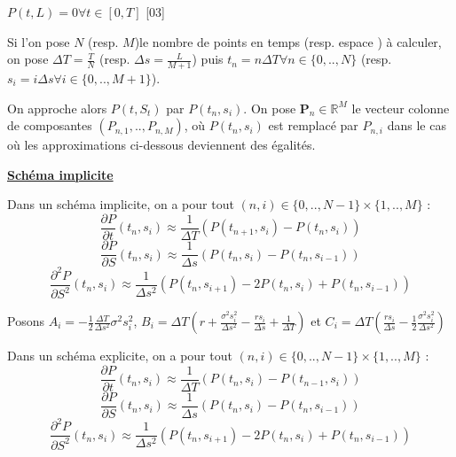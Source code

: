\documentclass{exam}
\begin{document}
$P(t,L) = 0 \forall t \in [0,T]$ \hspace{0.5cm} [03]


Si l'on pose $N$ (resp. $M$)le nombre de points en temps (resp. espace ) à calculer, on pose $\Delta T = \frac{T}{N}$ (resp. $\Delta s = \frac{L}{M+1}$) puis $t_n = n \Delta T \forall n \in \{0,..,N\}$ (resp. $s_i = i \Delta s \forall i \in \{0,..,M+1\}$).

On approche alors $P(t,S_t)$ par $P(t_n,s_i)$. On pose $\textbf{P}_n \in \mathbb{R}^M$ le vecteur colonne de composantes $(P_{n,1},..,P_{n,M})$, où $P(t_n,s_i)$ est remplacé par $P_{n,i}$ dans le cas où les approximations ci-dessous deviennent des égalités.

\textbf\underline{{Schéma implicite}}

Dans un schéma implicite, on a pour tout $(n,i) \in \{0,..,N-1\} \times \{1,..,M\}$ :
$$\frac{\partial P}{\partial t}(t_n,s_i) \approx \frac{1}{\Delta T}(P(t_{n+1},s_i)-P(t_n,s_i))$$
$$\frac{\partial P}{\partial S}(t_n,s_i) \approx \frac{1}{\Delta s}(P(t_n,s_i)-P(t_n,s_{i-1}))$$
$$\frac{\partial^2 P}{\partial S^2}(t_n,s_i) \approx \frac{1}{\Delta s^2}(P(t_n,s_{i+1})-2P(t_n,s_i)+P(t_n,s_{i-1}))$$

Posons $A_i=-\frac{1}{2} \frac{\Delta T}{\Delta s^2} \sigma^2 s_i^2$, $B_i=\Delta T (r + \frac{\sigma^2 s_i^2}{\Delta s^2}-\frac{r s_i}{\Delta s}+\frac{1}{\Delta T})$ et $C_i=\Delta T (\frac{r s_i}{\Delta s} - \frac{1}{2}\frac{\sigma^2 s_i^2}{\Delta s^2})$

Dans un schéma explicite, on a pour tout $(n,i) \in \{0,..,N-1\} \times \{1,..,M\}$ :
$$\frac{\partial P}{\partial t}(t_n,s_i) \approx \frac{1}{\Delta T}(P(t_n,s_i)-P(t_{n-1},s_i))$$
$$\frac{\partial P}{\partial S}(t_n,s_i) \approx \frac{1}{\Delta s}(P(t_n,s_i)-P(t_n,s_{i-1}))$$
$$\frac{\partial^2 P}{\partial S^2}(t_n,s_i) \approx \frac{1}{\Delta s^2}(P(t_n,s_{i+1})-2P(t_n,s_i)+P(t_n,s_{i-1}))$$
\end{document}
